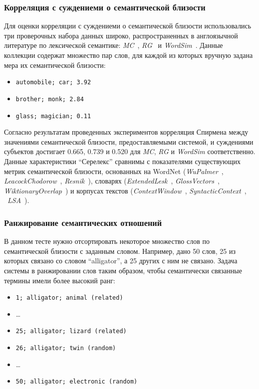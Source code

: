 \documentclass[a4paper,10pt,twoside]{article}
\begin{document}
\subsubsection{Корреляция с суждениеми о семантической близости} Для оценки корреляции с суждениеми о семантической близости использовались три проверочных набора данных широко, распространенных в англоязычной литературе по лексической семантике: \textit{MC}~\cite{miller1993semantic}, \textit{RG}~\cite{rubenstein1965} и \textit{WordSim}~\cite{finkelstein2001placing}. Данные коллекции содержат множество пар слов, для каждой из которых вручную задана мера их семантической близости:
\begin{itemize}
  \footnotesize
  \item \texttt{automobile; car; 3.92}
  \item \texttt{brother; monk; 2.84}
  \item \texttt{glass; magician; 0.11}
\end{itemize}

 Согласно результатам проведенных экспериментов корреляция Спирмена между значениями семантической близости, предоставляемыми системой, и суждениями субъектов достигает 
0.665, 0.739 и 0.520 для \textit{MC}, \textit{RG} и \textit{WordSim} соответственно. Данные характеристики "`Серелекс"' сравнимы с показателями существующих метрик семантической близости, основанных на WordNet (\textit{WuPalmer}~\cite{wu1994verbs}, \textit{LeacockChodorow}~\cite{leacock1998}, \textit{Resnik}~\cite{resnik1995}), словарях (\textit{ExtendedLesk}~\cite{banerjee2003extended}, \textit{GlossVectors}~\cite{patwardhan2006using}, \textit{WiktionaryOverlap}~\cite{zesch2008extracting}) и  корпусах текстов (\textit{ContextWindow}~\cite{cruys2010mining}, \textit{SyntacticContext}~\cite{cruys2010mining}, ~\textit{LSA}~\cite{landauer1998introduction}).

\subsubsection{Ранжирование семантических отношений}

В данном тесте нужно отсортировать некоторое множество слов по семантической близости с заданным словом. Например, дано 50 слов, 25 из которых связано со словом ``alligator'', а 25 других с ним не связано. Задача системы в ранжировании слов таким образом, чтобы семантически связанные термины имели более высокий ранг:

\begin{itemize}
\footnotesize
\item \texttt{1; alligator; animal (related)}
\item \ldots
\item \texttt{25; alligator; lizard (related)}
\item \texttt{26; alligator; twin (random)}
\item \ldots
\item \texttt{50; alligator; electronic (random) }
\end{itemize}
\end{document}
